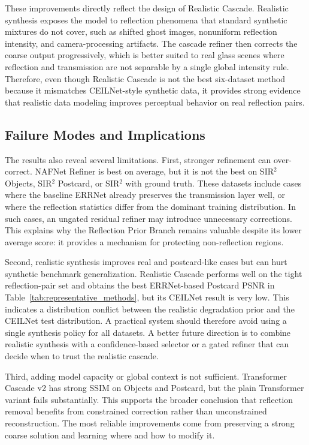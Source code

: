 These improvements directly reflect the design of Realistic Cascade. Realistic synthesis exposes the model to reflection phenomena that standard synthetic mixtures do not cover, such as shifted ghost images, nonuniform reflection intensity, and camera-processing artifacts. The cascade refiner then corrects the coarse output progressively, which is better suited to real glass scenes where reflection and transmission are not separable by a single global intensity rule. Therefore, even though Realistic Cascade is not the best six-dataset method because it mismatches CEILNet-style synthetic data, it provides strong evidence that realistic data modeling improves perceptual behavior on real reflection pairs.

\subsection{Failure Modes and Implications}

The results also reveal several limitations. First, stronger refinement can over-correct. NAFNet Refiner is best on average, but it is not the best on SIR$^2$ Objects, SIR$^2$ Postcard, or SIR$^2$ with ground truth. These datasets include cases where the baseline ERRNet already preserves the transmission layer well, or where the reflection statistics differ from the dominant training distribution. In such cases, an ungated residual refiner may introduce unnecessary corrections. This explains why the Reflection Prior Branch remains valuable despite its lower average score: it provides a mechanism for protecting non-reflection regions.

Second, realistic synthesis improves real and postcard-like cases but can hurt synthetic benchmark generalization. Realistic Cascade performs well on the tight reflection-pair set and obtains the best ERRNet-based Postcard PSNR in Table~\ref{tab:representative_methods}, but its CEILNet result is very low. This indicates a distribution conflict between the realistic degradation prior and the CEILNet test distribution. A practical system should therefore avoid using a single synthesis policy for all datasets. A better future direction is to combine realistic synthesis with a confidence-based selector or a gated refiner that can decide when to trust the realistic cascade.

Third, adding model capacity or global context is not sufficient. Transformer Cascade v2 has strong SSIM on Objects and Postcard, but the plain Transformer variant fails substantially. This supports the broader conclusion that reflection removal benefits from constrained correction rather than unconstrained reconstruction. The most reliable improvements come from preserving a strong coarse solution and learning where and how to modify it.

